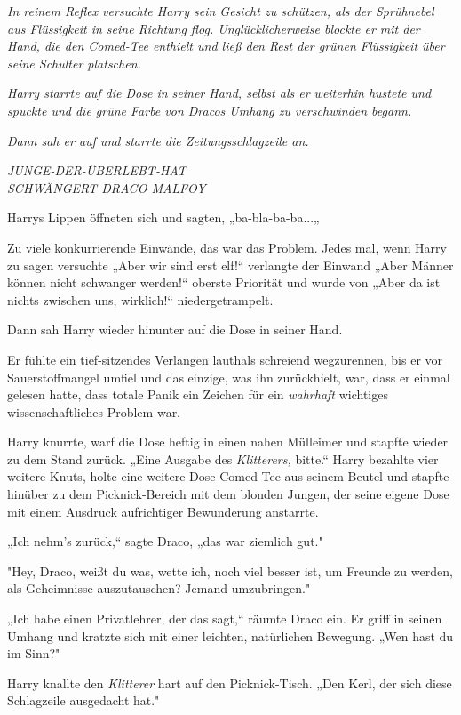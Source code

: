 {\emph{In reinem Reflex versuchte Harry sein Gesicht zu schützen, als der Sprühnebel aus Flüssigkeit in seine Richtung flog. Unglücklicherweise blockte er mit der Hand, die den Comed-Tee enthielt und ließ den Rest der grünen Flüssigkeit über seine Schulter platschen.}

\emph{Harry starrte auf die Dose in seiner Hand, selbst als er weiterhin hustete und spuckte und die grüne Farbe von Dracos Umhang zu verschwinden begann.}

\emph{Dann sah er auf und starrte die Zeitungsschlagzeile an.}

\emph{JUNGE-DER-ÜBERLEBT-HAT\\ SCHWÄNGERT DRACO MALFOY}

\hfill\break Harrys Lippen öffneten sich und sagten, „ba-bla-ba-ba...„

Zu viele konkurrierende Einwände, das war das Problem. Jedes mal, wenn Harry zu sagen versuchte „Aber wir sind erst elf!“ verlangte der Einwand „Aber Männer können nicht schwanger werden!“ oberste Priorität und wurde von „Aber da ist nichts zwischen uns, wirklich!“ niedergetrampelt.

Dann sah Harry wieder hinunter auf die Dose in seiner Hand.

Er fühlte ein tief-sitzendes Verlangen lauthals schreiend wegzurennen, bis er vor Sauerstoffmangel umfiel und das einzige, was ihn zurückhielt, war, dass er einmal gelesen hatte, dass totale Panik ein Zeichen für ein \emph{wahrhaft} wichtiges wissenschaftliches Problem war.

Harry knurrte, warf die Dose heftig in einen nahen Mülleimer und stapfte wieder zu dem Stand zurück. „Eine Ausgabe des \emph{Klitterers,} bitte.“ Harry bezahlte vier weitere Knuts, holte eine weitere Dose Comed-Tee aus seinem Beutel und stapfte hinüber zu dem Picknick-Bereich mit dem blonden Jungen, der seine eigene Dose mit einem Ausdruck aufrichtiger Bewunderung anstarrte.

„Ich nehm's zurück,“ sagte Draco, „das war ziemlich gut."

"Hey, Draco, weißt du was, wette ich, noch viel besser ist, um Freunde zu werden, als Geheimnisse auszutauschen? Jemand umzubringen."

„Ich habe einen Privatlehrer, der das sagt,“ räumte Draco ein. Er griff in seinen Umhang und kratzte sich mit einer leichten, natürlichen Bewegung. „Wen hast du im Sinn?"

Harry knallte den \emph{Klitterer} hart auf den Picknick-Tisch. „Den Kerl, der sich diese Schlagzeile ausgedacht hat."

}
